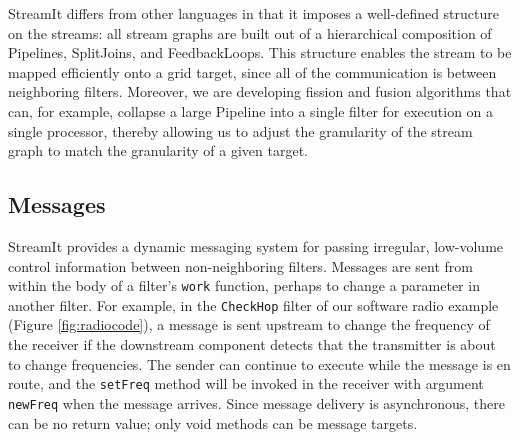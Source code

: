 \documentclass{sig-alternate}
\begin{document}


StreamIt differs from other languages in that it imposes a
well-defined structure on the streams: all stream graphs are built out
of a hierarchical composition of Pipelines, SplitJoins, and
FeedbackLoops.  This structure enables the stream to be mapped
efficiently onto a grid target, since all of the communication is
between neighboring filters.  Moreover, we are developing fission and
fusion algorithms that can, for example, collapse a large Pipeline
into a single filter for execution on a single processor, thereby
allowing us to adjust the granularity of the stream graph to match the
granularity of a given target.


\subsection{Messages}

StreamIt provides a dynamic messaging system for passing irregular,
low-volume control information between non-neighboring filters.
Messages are sent from within the body of a filter's {\tt work}
function, perhaps to change a parameter in another filter.  For
example, in the {\tt CheckHop} filter of our software radio example
(Figure \ref{fig:radiocode}), a message is sent upstream to change the
frequency of the receiver if the downstream component detects that the
transmitter is about to change frequencies.  The sender can continue
to execute while the message is en route, and the {\tt setFreq} method
will be invoked in the receiver with argument {\tt newFreq} when the
message arrives.  Since message delivery is asynchronous, there can be
no return value; only void methods can be message targets.
\end{document}
